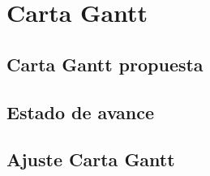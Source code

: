  
\chapter{Carta Gantt}
\section{Carta Gantt propuesta}

\section{Estado de avance}

\section{Ajuste Carta Gantt}

